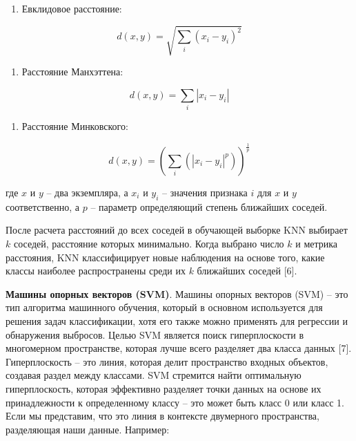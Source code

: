 \begin{enumerate}
\def\labelenumi{\arabic{enumi}.}
\item
  Евклидовое расстояние:
\end{enumerate}
\begin{equation}
	d(x,y)=\sqrt{\sum_{i} (x_i-y_i)^2}
\end{equation}

\begin{enumerate}
\def\labelenumi{\arabic{enumi}.}
\setcounter{enumi}{1}
\item
  Расстояние Манхэттена:
\end{enumerate}
\begin{equation}
	d(x,y)=\sum_{i} |x_i - y_i|
\end{equation}

\begin{enumerate}
\def\labelenumi{\arabic{enumi}.}
\setcounter{enumi}{2}
\item
  Расстояние Минковского:
\end{enumerate}

\begin{equation}
	d(x,y)=(\sum_{i} (|x_i - y_i|^p))^\frac{1}{p}
\end{equation}

где $x $ и $y $ -- два экземпляра, а $x_i$ и $y_i$ -- значения признака $i$ для $x$ и $y$
соответственно, а $p$ -- параметр определяющий степень ближайших соседей.

После расчета расстояний до всех соседей в обучающей выборке KNN
выбирает $k$ соседей, расстояние которых
минимально. Когда выбрано число $k$ и метрика расстояния, KNN классифицирует новые наблюдения на основе того,
какие классы наиболее распространены среди их $k$ ближайших соседей {[}6{]}.

{\bfseries Машины опорных векторов (SVM)}. Машины опорных векторов (SVM) --
это тип алгоритма машинного обучения, который в основном используется
для решения задач классификации, хотя его также можно применять для
регрессии и обнаружения выбросов. Целью SVM является поиск гиперплоскости в многомерном пространстве, которая лучше всего разделяет
два класса данных {[}7{]}.\\ Гиперплоскость -- это линия, которая делит
пространство входных объектов, создавая раздел между классами. SVM
стремится найти оптимальную гиперплоскость, которая эффективно разделяет
точки данных на основе их принадлежности к определенному классу -- это
может быть класс 0 или класс 1. Если мы представим, что это линия в
контексте двумерного пространства, разделяющая наши данные. Например:

